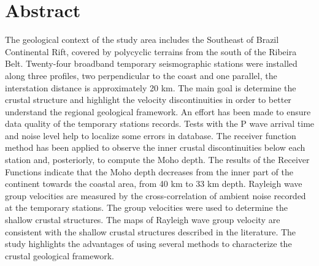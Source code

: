 \chapter*{Abstract}

The geological context of the study area includes the Southeast of Brazil Continental Rift, covered by polycyclic terrains from the south of the Ribeira Belt. Twenty-four broadband temporary seismographic stations were installed along three profiles, two perpendicular to the coast and one parallel, the interstation distance is approximately 20 km.  The main goal is determine the crustal structure and highlight the velocity discontinuities in order to better understand the regional geological framework. An effort has been made to ensure data quality of the temporary stations records. Tests with the P wave arrival time and noise level help to localize some errors in database. The receiver function method has been applied to observe the inner crustal discontinuities below each station and, posteriorly, to compute the Moho depth. The results of the Receiver Functions indicate that the Moho depth decreases from the inner part of the continent towards the coastal area, from 40 km to 33 km depth. Rayleigh wave group velocities are measured by the cross-correlation of ambient noise recorded at the temporary stations. The group velocities were used to determine the shallow crustal structures. The maps of Rayleigh wave group velocity are consistent with the shallow crustal structures described in the literature. The study highlights the advantages of using several methods to characterize the crustal geological framework. 